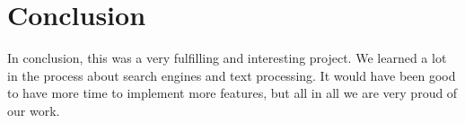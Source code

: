 \section{Conclusion}
In conclusion, this was a very fulfilling and interesting project. We learned a lot in the process about search engines and text processing. It would have been good to have more time to implement more features, but all in all we are very proud of our work. 
